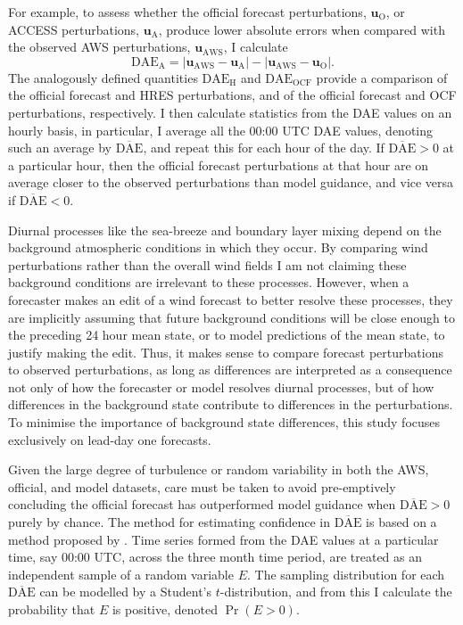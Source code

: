 \documentclass[twocol]{ametsoc}
\DeclareMathOperator{\pr}{Pr}
\begin{document}
For example, to assess whether the official forecast perturbations, $\mathbf{u}_{\text{O}}$, or ACCESS perturbations, $\mathbf{u}_{\text{A}}$, produce lower absolute errors when compared with the observed AWS perturbations, $\mathbf{u}_{\text{AWS}}$, I calculate 
\begin{equation}
\text{DAE}_\text{A} = \left\lvert \mathbf{u}_{\text{AWS}}-\mathbf{u}_{\text{A}} \right\rvert - \left\lvert \mathbf{u}_{\text{AWS}}-\mathbf{u}_{\text{O}} \right\rvert. \label{Eq:DAE}
\end{equation} 
The analogously defined quantities $\text{DAE}_\text{H}$ and $\text{DAE}_\text{OCF}$ provide a comparison of the official forecast and HRES perturbations, and of the official forecast and OCF perturbations, respectively. I then calculate statistics from the DAE values on an hourly basis, in particular, I average all the 00:00 UTC DAE values, denoting such an average by $\overline{\text{DAE}}$, and repeat this for each hour of the day. If $\overline{\text{DAE}}>0$ at a particular hour, then the official forecast perturbations at that hour are on average closer to the observed perturbations than model guidance, and vice versa if $\overline{\text{DAE}}<0$.

Diurnal processes like the sea-breeze and boundary layer mixing depend on the background atmospheric conditions in which they occur. By comparing wind perturbations rather than the overall wind fields I am not claiming these background conditions are irrelevant to these processes. However, when a forecaster makes an edit of a wind forecast to better resolve these processes, they are implicitly assuming that future background conditions will be close enough to the preceding 24 hour mean state, or to model predictions of the mean state, to justify making the edit. Thus, it makes sense to compare forecast perturbations to observed perturbations, as long as differences are interpreted as a consequence not only of how the forecaster or model resolves diurnal processes, but of how differences in the background state contribute to differences in the perturbations. To minimise the importance of background state differences, this study focuses exclusively on lead-day one forecasts.

Given the large degree of turbulence or random variability in both the AWS, official, and model datasets, care must be taken to avoid pre-emptively concluding the official forecast has outperformed model guidance when $\overline{\text{DAE}}>0$ purely by chance. The method for estimating confidence in $\overline{\text{DAE}}$ is based on a method proposed by \citet{griffiths17}. Time series formed from the DAE values at a particular time, say 00:00 UTC, across the three month time period, are treated as an independent sample of a random variable $E$. The sampling distribution for each $\overline{\text{DAE}}$ can be modelled by a Student's $t$-distribution, and from this I calculate the probability that $E$ is positive, denoted $\pr\left(E > 0\right)$. 
\end{document}
